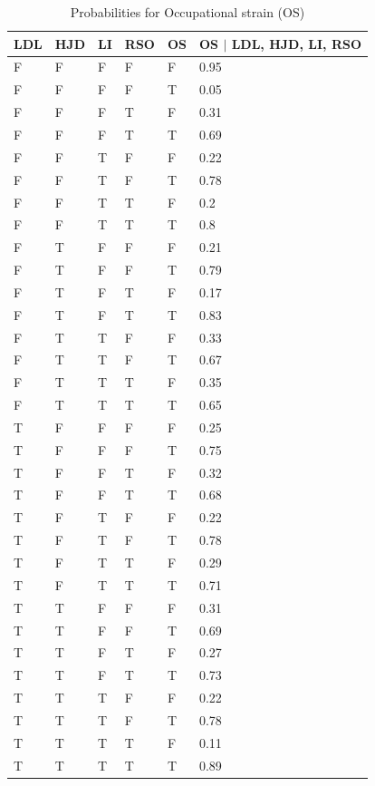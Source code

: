 \begin{table}
\centering
\caption{Probabilities for Occupational strain (OS)}\label{tab1}
\begin{tabular}{p{1.2cm} p{1.2cm} p{1.2cm} p{1.2cm} p{1.2cm} p{2cm} }
\hline
LDL & HJD & LI & RSO & OS & OS $\mid$ LDL, HJD, LI, RSO\\
\hline
F &	F &	F &	F &	F &	0.95\\
F &	F &	F&	F &	T &	0.05\\
F &	F &	F &	T &	F &	0.31\\
F & F &	F &	T &	T &	0.69\\
F &	F &	T &	F &	F &	0.22\\
F &	F &	T &	F &	T &	0.78\\
F &	F & T &	T &	F &	0.2\\
F &	F &	T &	T &	T &	0.8\\
F &	T &	F &	F &	F &	0.21\\
F & T &	F &	F &	T &	0.79\\
F &	T &	F &	T &	F &	0.17\\
F &	T &	F &	T &	T &	0.83\\
F &	T &	T &	F &	F &	0.33\\
F &	T &	T &	F &	T &	0.67\\
F &	T &	T &	T &	F &	0.35\\
F & T &	T &	T &	T & 	0.65\\
T &	F &	F &	F &	F &	0.25\\
T &	F &	F &	F &	T &	0.75\\
T & 	F &	F &	T &	F &	0.32\\
T &	F &	F &	T &	T &	0.68\\
T &	F &	T &	F &	F &	0.22\\
T &	F &	T &	F &	T & 	0.78\\
T & 	F &	T &	T &	F &	0.29\\
T &	F &	T &	T &	T &	0.71\\
T &	T &	F &	F &	F &	0.31\\
T &	T &	F &	F &	T & 	0.69\\
T &	T &	F &	T &	F &	0.27\\
T &	T &	F &	T &	T &	0.73\\
T &	T &	T &	F &	F &	0.22\\
T &	T &	T &	F &	T &	0.78\\
T &	T &	T &	T &	F &	0.11\\
T &	T &	T &	T &	T &	0.89\\

\hline
\end{tabular}
\end{table}

